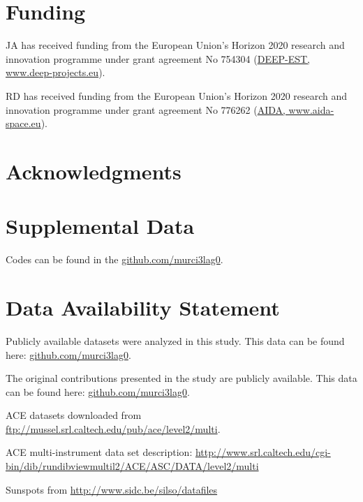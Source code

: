 \documentclass[utf8]{frontiersSCNS} %
\begin{document}
\section*{Funding}

JA has received funding from the European Union’s Horizon 2020 research and innovation programme under grant agreement No 754304 (\href{https://www.deep-projects.eu}{DEEP-EST, www.deep-projects.eu}).

RD has received funding from the European Union’s Horizon 2020 research and innovation programme under grant agreement No 776262 (\href{https://www.aida-space.eu}{AIDA, www.aida-space.eu}).

\section*{Acknowledgments}

\section*{Supplemental Data}
Codes can be found in the \href{http://github.com/murci3lag0}{github.com/murci3lag0}.

\section*{Data Availability Statement}
\label{sec:repos}

Publicly available datasets were analyzed in this study. This data can be found here: \href{http://github.com/murci3lag0}{github.com/murci3lag0}.

The original contributions presented in the study are publicly available. This data can be found here: \href{http://github.com/murci3lag0}{github.com/murci3lag0}.

ACE datasets downloaded from \href{ftp://mussel.srl.caltech.edu/pub/ace/level2/multi}{ftp://mussel.srl.caltech.edu/pub/ace/level2/multi}.

ACE multi-instrument data set description: \href{http://www.srl.caltech.edu/cgi-bin/dib/rundibviewmultil2/ACE/ASC/DATA/level2/multi}{http://www.srl.caltech.edu/cgi-bin/dib/rundibviewmultil2/ACE/ASC/DATA/level2/multi}

Sunspots from \href{http://www.sidc.be/silso/datafiles}{http://www.sidc.be/silso/datafiles}

\end{document}
